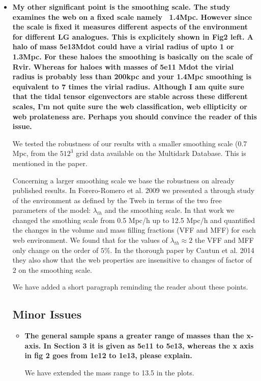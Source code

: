 \documentclass{article}
\begin{document}
\begin{itemize}
\item
{\bf My other significant point is the smoothing scale. The study examines the web on a fixed scale namely ~1.4Mpc. However since the scale is fixed it measures different aspects of the environment for different LG analogues. This is explicitely shown in Fig2 left. A halo of mass 5e13Mdot could have a virial radius of upto 1 or 1.3Mpc. For these haloes the smoothing is basically on the scale of Rvir. Whereas for haloes with masses of 5e11 Mdot the virial radius is probably less than 200kpc and your 1.4Mpc smoothing is equivalent to 7 times the virial radius.  Although I am quite sure that the tidal tensor eigenvectors are stable across these different scales, I'm not quite sure the web classification, web ellipticity or web prolateness are. Perhaps you should convince the reader of this issue.}


We tested the robustness of our results with a smaller smoothing scale (0.7 Mpc, from the $512^3$ grid data available on the Multidark Database. This is mentioned in the paper.

Concerning a larger smoothing scale we base the robustness on already published results. In Forero-Romero et al. 2009  we presented a through study of the environment as defined by the Tweb in terms of the two free parameters of the model: $\lambda_{th}$ and the smoothing scale. In that work we changed the smothing scale from 0.5 Mpc/h up to 12.5 Mpc/h and quantified the changes in the volume and mass filling fractions (VFF and MFF) for each web environment. We found that for the values of $\lambda_{th}\approx 2$ the VFF and MFF only change on the order of $5\%$. In the thorough paper by Cautun et al. 2014 they also show that the web properties are insensitive to changes of factor of $2$ on the smoothing scale.


We have added a short paragraph reminding the reader about these points. 


\subsection{Minor Issues}
\begin{itemize}

\item
{\bf The general sample spans a greater range of masses than the x-axis. In Section 3 it is given as 5e11 to 5e13, whereas the x axis in fig 2 goes from 1e12 to 1e13, please explain.}

We have extended the mass range to 13.5 in the plots.



\end{itemize}
\end{itemize}
\end{document}
